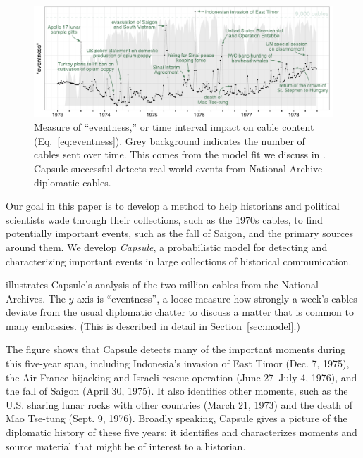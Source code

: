 \begin{figure}[ht]
\centering
\includegraphics[width=\linewidth]{fig/cables_events.pdf}
\caption{Measure of ``eventness,'' or time interval impact on cable content (Eq.~\ref{eq:eventness}).  Grey background indicates the number of cables sent over time.  This comes from the model fit we discuss in .  Capsule successful detects real-world events from National Archive diplomatic cables.}
\label{fig:cables_events}
\end{figure}

Our goal in this paper is to develop a method to help historians and
political scientists wade through their collections, such as the 1970s
cables, to find potentially important events, such as the fall of
Saigon, and the primary sources around them. We develop
\textit{Capsule}, a probabilistic model for detecting and
characterizing important events in large collections of historical
communication.

 illustrates Capsule's analysis of the two
million cables from the National Archives. The \mbox{$y$-axis} is
``eventness'', a loose measure how strongly a week's cables deviate
from the usual diplomatic chatter to discuss a matter that is common
to many embassies. (This is described in detail in Section~\ref{sec:model}.)

The figure shows that Capsule detects many of the important moments
during this five-year span, including Indonesia's invasion of East
Timor (Dec. 7, 1975), the Air France hijacking and Israeli rescue operation
(June 27--July 4, 1976), and the fall of Saigon (April 30, 1975). It also identifies other moments,
such as the U.S. sharing lunar rocks with other countries (March 21, 1973) and
the death of Mao Tse-tung (Sept. 9, 1976). Broadly speaking, Capsule gives a
picture of the diplomatic history of these five years; it identifies
and characterizes moments and source material that might be of
interest to a historian.

